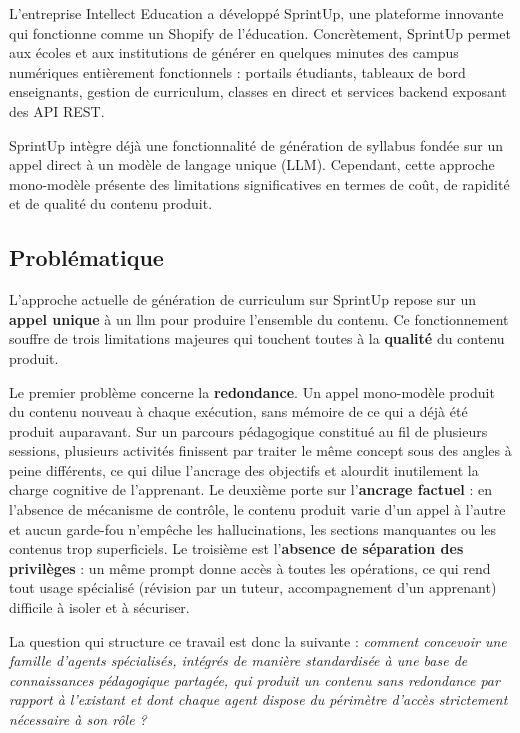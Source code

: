 L'entreprise Intellect Education a développé SprintUp, une plateforme innovante qui
fonctionne comme un \og{}Shopify de l'éducation\fg{}. Concrètement, SprintUp permet
aux écoles et aux institutions de générer en quelques minutes des campus numériques
entièrement fonctionnels : portails étudiants, tableaux de bord enseignants, gestion
de curriculum, classes en direct et services backend exposant des API REST.

SprintUp intègre déjà une fonctionnalité de génération de syllabus fondée sur un
appel direct à un modèle de langage unique (LLM). Cependant, cette approche
mono-modèle présente des limitations significatives en termes de coût, de rapidité
et de qualité du contenu produit.

\subsection*{Problématique}

L'approche actuelle de génération de curriculum sur SprintUp repose
sur un \textbf{appel unique} à un \gls{llm} pour produire
l'ensemble du contenu. Ce fonctionnement souffre de trois
limitations majeures qui touchent toutes à la \textbf{qualité} du
contenu produit.

Le premier problème concerne la \textbf{redondance}. Un appel
mono-modèle produit du contenu nouveau à chaque exécution, sans
mémoire de ce qui a déjà été produit auparavant. Sur un parcours
pédagogique constitué au fil de plusieurs sessions, plusieurs
activités finissent par traiter le même concept sous des angles à
peine différents, ce qui dilue l'ancrage des objectifs et
alourdit inutilement la charge cognitive de l'apprenant. Le
deuxième porte sur l'\textbf{ancrage factuel} : en l'absence de
mécanisme de contrôle, le contenu produit varie d'un appel à
l'autre et aucun garde-fou n'empêche les hallucinations, les
sections manquantes ou les contenus trop superficiels. Le
troisième est l'\textbf{absence de séparation des privilèges} :
un même prompt donne accès à toutes les opérations, ce qui rend
tout usage spécialisé (révision par un tuteur, accompagnement
d'un apprenant) difficile à isoler et à sécuriser.

\medskip
\noindent
La question qui structure ce travail est donc la suivante :
\emph{comment concevoir une famille d'agents spécialisés,
intégrés de manière standardisée à une base de connaissances
pédagogique partagée, qui produit un contenu sans redondance par
rapport à l'existant et dont chaque agent dispose du périmètre
d'accès strictement nécessaire à son rôle ?}


